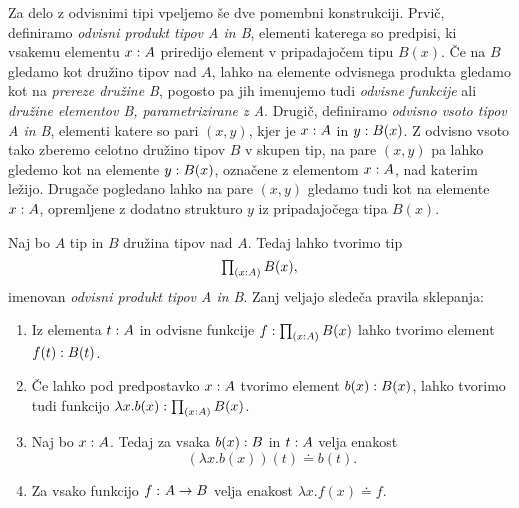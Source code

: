 Za delo z odvisnimi tipi vpeljemo še dve pomembni konstrukciji. Prvič, definiramo
\emph{odvisni produkt tipov A in B}, elementi katerega so predpisi, ki vsakemu elementu
\({x : A}\) priredijo element v pripadajočem tipu \(B(x)\).
Če na \(B\) gledamo kot družino tipov
nad \(A\), lahko na elemente odvisnega produkta gledamo kot na \emph{prereze družine B},
pogosto pa jih imenujemo tudi \emph{odvisne funkcije} ali \emph{družine elementov B,
parametrizirane z A}. Drugič, definiramo \emph{odvisno vsoto tipov A in B}, elementi
katere so pari \((x, y)\), kjer je \({x : A}\) in \({y : B(x)}\).
Z odvisno vsoto tako zberemo celotno družino tipov \(B\) v skupen tip,
na pare \((x, y)\) pa lahko gledemo kot na elemente \({y : B(x)}\), označene z
elementom \({x : A}\), nad katerim ležijo.
Drugače pogledano lahko na pare \((x, y)\) gledamo tudi kot na elemente
\({x : A}\), opremljene z dodatno strukturo \(y\) iz
pripadajočega tipa \(B(x)\).

\begin{definicija}
  Naj bo \(A\) tip in \(B\) družina tipov nad \(A\). Tedaj lahko tvorimo tip
  \[\textstyle \prod_{\left( {x : A} \right)} B(x),\] imenovan \emph{odvisni produkt tipov A in B}.
  Zanj veljajo sledeča pravila sklepanja:
  \begin{enumerate}
  \item Iz elementa \({t : A}\) in odvisne funkcije
    \({f : \textstyle \prod_{\left( {x : A} \right)} B(x)}\) lahko tvorimo element
    \({f(t) : B(t)}\).
\item Če lahko pod predpostavko \({x : A}\) tvorimo element
    \({b(x) : B(x)}\), lahko tvorimo tudi funkcijo
    \({{\lambda x.b(x) : \textstyle \prod_{\left( {x : A} \right)} B(x)}}\).
  \item Naj bo \({x : A}\). Tedaj za vsaka \({b(x) : B}\) in
    \({t : A}\) velja enakost \[(\lambda x.b(x))(t) \doteq b(t).\]
  \item Za vsako funkcijo \(f \,\colon A \to B\) velja enakost \(\lambda x.f(x) \doteq f\).
  \end{enumerate}
\end{definicija}

